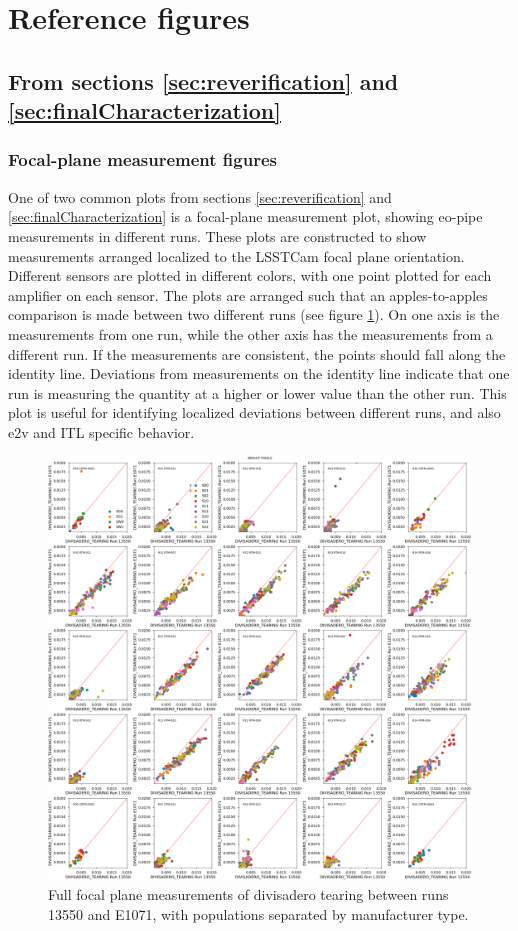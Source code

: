 \section{Reference figures}

\subsection{From sections \ref{sec:reverification} and \ref{sec:finalCharacterization}}
\subsubsection{Focal-plane measurement figures}

One of two common plots from sections \ref{sec:reverification} and \ref{sec:finalCharacterization} is a focal-plane measurement plot, showing eo-pipe measurements in different runs. These plots are constructed to show measurements arranged localized to the LSSTCam focal plane orientation. Different sensors are plotted in different colors, with one point plotted for each amplifier on each sensor. The plots are arranged such that an apples-to-apples comparison is made between two different runs (see figure \ref{fig:ref:eoPipeFP_5x5}). On one axis is the measurements from one run, while the other axis has the measurements from a different run. If the measurements are consistent, the points should fall along the identity line. Deviations from measurements on the identity line indicate that one run is measuring the quantity at a higher or lower value than the other run. This plot is useful for identifying localized deviations between different runs, and also e2v and ITL specific behavior.

\begin{figure}
    \centering
    \includegraphics[width=0.5\linewidth]{figures/baselineCharacterization/13550_E1071_DIVISADERO_TEARING_inset.png}
    \caption{Full focal plane measurements of divisadero tearing between runs 13550 and E1071, with populations separated by manufacturer type.}
    \label{fig:ref:eoPipeFP_5x5}
\end{figure}

